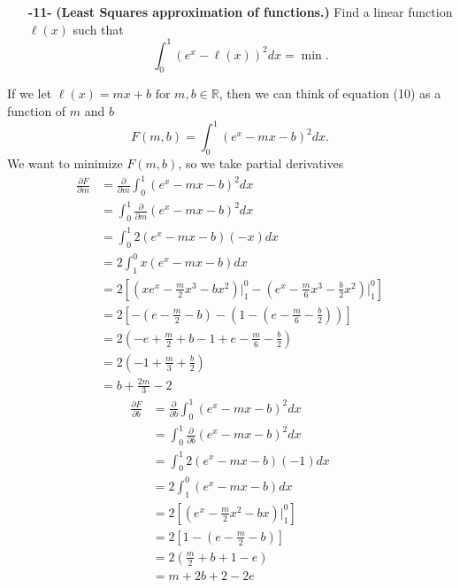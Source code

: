 \documentclass[11pt]{article}
\theoremstyle{definition}
\newcommand{\R}{\mathbb{R}}
\newcommand{\1}[1]{\mathbf{1} \left \{ #1 \right \}}
\begin{document}
\begin{itemize}
    \item[{\textbf{-11-}}] \textbf{(Least Squares approximation of functions.)}  Find a linear function $\ell(x)$ such that
    \begin{equation}
        \int_0^1 (e^x - \ell(x))^2 dx = \min.
    \end{equation}
\end{itemize}
If we let \(\ell(x) = mx+b \text{ for } m,b \in \R\), then we can think of equation (10) as a function of $m$ and $b$
\[F(m,b) = \int_0^1 (e^x - mx - b)^2 dx.\]
We want to minimize $F(m,b)$, so we take partial derivatives
\begin{equation*}
    \begin{split}
        \frac{\partial F}{\partial m} &= \frac{\partial}{\partial m} \int_0^1 (e^x - mx - b)^2 dx \\
        &= \int_0^1 \frac{\partial}{\partial m} (e^x - mx - b)^2 dx \\
        &= \int_0^1 2(e^x - mx - b)(-x)dx \\
        &= 2 \int_1^0 x(e^x - mx - b) dx \\
        &= 2 \left[\left(xe^x - \frac{m}{2}x^3 - bx^2\right) \Big|_1^0 -\left(e^x - \frac{m}{6}x^3 - \frac{b}{2}x^2\right)\Big|_1^0 \right] \\
        &= 2\left[-\left(e - \frac{m}{2} - b\right) - \left(1 - \left(e - \frac{m}{6} - \frac{b}{2}\right)\right)\right] \\
        &= 2\left(-e + \frac{m}{2} + b - 1 + e - \frac{m}{6} - \frac{b}{2}\right) \\
        &= 2\left(-1 + \frac{m}{3} + \frac{b}{2}\right) \\
        &= b + \frac{2m}{3} - 2
    \end{split}
\end{equation*}
\begin{equation*}
    \begin{split}
        \frac{\partial F}{\partial b} &= \frac{\partial}{\partial b} \int_0^1 (e^x - mx - b)^2 dx \\
        &= \int_0^1 \frac{\partial}{\partial b} (e^x - mx - b)^2 dx \\
        &= \int_0^1 2(e^x - mx - b)(-1)dx \\
        &= 2 \int_1^0 (e^x - mx - b) dx \\
        &= 2 \left[\left(e^x - \frac{m}{2}x^2 - bx\right) \Big|_1^0 \right] \\
        &= 2\left[1 - \left(e - \frac{m}{2} - b\right)\right] \\
        &= 2\left(\frac{m}{2} + b + 1 - e\right) \\
        &= m + 2b + 2 - 2e
    \end{split}
\end{equation*}
\end{document}
